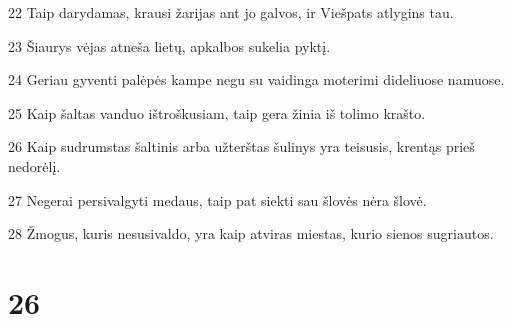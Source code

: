 \par 22 Taip darydamas, krausi žarijas ant jo galvos, ir Viešpats atlygins tau. 
\par 23 Šiaurys vėjas atneša lietų, apkalbos sukelia pyktį. 
\par 24 Geriau gyventi palėpės kampe negu su vaidinga moterimi dideliuose namuose. 
\par 25 Kaip šaltas vanduo ištroškusiam, taip gera žinia iš tolimo krašto. 
\par 26 Kaip sudrumstas šaltinis arba užterštas šulinys yra teisusis, krentąs prieš nedorėlį. 
\par 27 Negerai persivalgyti medaus, taip pat siekti sau šlovės nėra šlovė. 
\par 28 Žmogus, kuris nesusivaldo, yra kaip atviras miestas, kurio sienos sugriautos.



\chapter{26}


